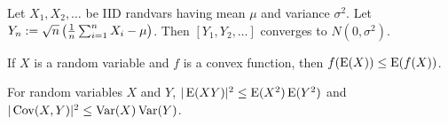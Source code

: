 \documentclass[a4paper, 12pt, fleqn]{article}
\DeclareMathOperator{\Cov}{Cov}
\begin{document}
\begin{theorem}
Let $X_1, X_2, \ldots$ be IID randvars having mean $\mu$ and variance $\sigma^2$.
Let $Y_n := \sqrt{n}\left(\frac{1}{n}\sum_{i=1}^n X_i - \mu\right)$.
Then $[Y_1, Y_2, \ldots]$ converges to $N(0, \sigma^2)$.
\end{theorem}

\begin{theorem}
If $X$ is a random variable and $f$ is a convex function, then $f(\operatorname*{E}(X)) \le \operatorname*{E}(f(X))$.
\end{theorem}

\begin{theorem}
For random variables $X$ and $Y$, $|\operatorname*{E}(XY)|^2 \le \operatorname*{E}(X^2)\operatorname*{E}(Y^2)$
and $|\Cov(X,Y)|^2 \le \Var(X)\Var(Y)$.
\end{theorem}

\end{document}
